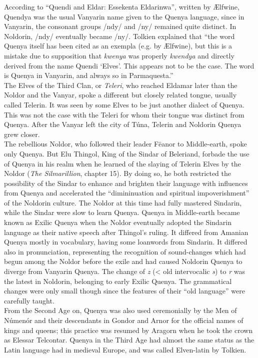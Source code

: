 \documentclass[pub]{apa6}
\begin{document}
\indent According to ``Quendi and Eldar: Essekenta Eldarinwa'', written by \AE lfwine, Quendya was the usual Vanyarin name given to the Quenya language, since in Vanyarin, the consonant groups /ndy/ and /ny/ remained quite distinct. In Noldorin, /ndy/ eventually became /ny/. Tolkien explained that ``the word Quenya itself has been cited as an exempla (e.g. by \AE lfwine), but this is a mistake due to supposition that {\it kwenya} was properly {\it kwendya} and directly derived from the name Quendi `Elves'. This appears not to be the case. The word is Quenya in Vanyarin, and always so in Parmaquesta.''\\
\indent The Elves of the Third Clan, or {\it Teleri}, who reached Eldamar later than the Noldor and the Vanyar, spoke a different but closely related tongue, usually called Telerin. It was seen by some Elves to be just another dialect of Quenya. This was not the case with the Teleri for whom their tongue was distinct from Quenya. After the Vanyar left the city of T\'una, Telerin and Noldorin Quenya grew closer.\\
\indent The rebellious Noldor, who followed their leader F\"eanor to Middle-earth, spoke only Quenya. But Elu Thingol, King of the Sindar of Beleriand, forbade the use of Quenya in his realm when he learned of the slaying of Telerin Elves by the Noldor ({\it The Silmarillion}, chapter 15). By doing so, he both restricted the possibility of the Sindar to enhance and brighten their language with influences from Quenya and accelerated the ``dimininuation and spiritual impoverishment'' of the Noldorin culture. The Noldor at this time had fully mastered Sindarin, while the Sindar were slow to learn Quenya. Quenya in Middle-earth became known as Exilic Quenya when the Noldor eventually adopted the Sindarin language as their native speech after Thingol's ruling. It differed from Amanian Quenya mostly in vocabulary, having some loanwords from Sindarin. It differed also in pronunciation, representing the recognition of sound-changes which had begun among the Noldor before the exile and had caused Noldorin Quenya to diverge from Vanyarin Quenya. The change of {\it z} (< old intervocalic {\it s}) to {\it r} was the latest in Noldorin, belonging to early Exilic Quenya. The grammatical changes were only small though since the features of their ``old language'' were carefully taught.\\
\indent From the Second Age on, Quenya was also used ceremonially by the Men of N\'umen\'or and their descendants in Gondor and Arnor for the official names of kings and queens; this practice was resumed by Aragorn when he took the crown as Elessar Telcontar. Quenya in the Third Age had almost the same status as the Latin language had in medieval Europe, and was called Elven-latin by Tolkien.
\end{document}
